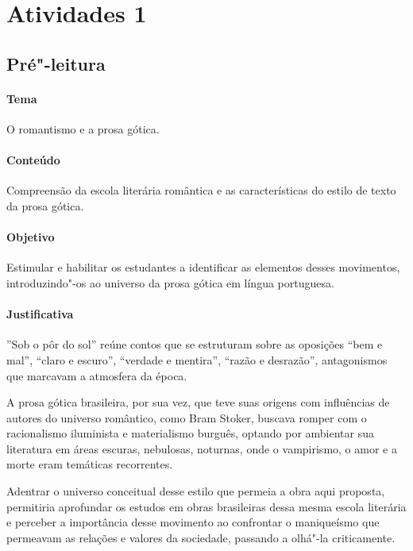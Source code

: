 \documentclass[12pt]{extarticle}
\begin{document}
\tableofcontents


\section{Atividades 1}


\subsection{Pré"-leitura}


\paragraph{Tema} O romantismo e a prosa gótica.

\paragraph{Conteúdo} Compreensão da escola literária romântica e as 
características do estilo de texto da prosa gótica.

\paragraph{Objetivo} Estimular e habilitar os estudantes a identificar as 
elementos desses movimentos, introduzindo"-os ao universo da prosa gótica
em língua portuguesa.  

\paragraph{Justificativa} ''Sob o pôr do sol'' reúne contos que se estruturam 
sobre as oposições ``bem e mal'', ``claro e escuro'', ``verdade e mentira'', 
``razão e desrazão'', antagonismos que marcavam a atmosfera da época.

A prosa gótica brasileira, por sua vez, que teve suas origens com influências de autores do
universo romântico, como Bram Stoker, buscava romper com o racionalismo iluminista 
e materialismo burguês, optando por ambientar sua literatura em áreas escuras, nebulosas,
noturnas, onde o vampirismo, o amor e a morte eram temáticas recorrentes. 

Adentrar o universo conceitual desse estilo que permeia a obra aqui proposta, permitiria
aprofundar os estudos em obras brasileiras dessa mesma escola literária e perceber a importância
desse movimento ao confrontar o maniqueísmo que permeavam as relações e valores da sociedade, 
passando a olhá"-la criticamente. 
\end{document}
